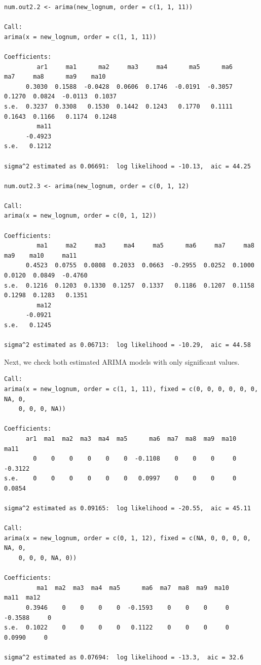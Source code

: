 \documentclass[a4paper]{article}
\begin{document}
\begin{verbatim}
num.out2.2 <- arima(new_lognum, order = c(1, 1, 11))

Call:
arima(x = new_lognum, order = c(1, 1, 11))

Coefficients:
         ar1     ma1      ma2     ma3     ma4      ma5      ma6     ma7     ma8      ma9    ma10
      0.3030  0.1588  -0.0428  0.0606  0.1746  -0.0191  -0.3057  0.1270  0.0824  -0.0113  0.1037
s.e.  0.3237  0.3308   0.1530  0.1442  0.1243   0.1770   0.1111  0.1643  0.1166   0.1174  0.1248
         ma11
      -0.4923
s.e.   0.1212

sigma^2 estimated as 0.06691:  log likelihood = -10.13,  aic = 44.25

num.out2.3 <- arima(new_lognum, order = c(0, 1, 12)

Call:
arima(x = new_lognum, order = c(0, 1, 12))

Coefficients:
         ma1     ma2     ma3     ma4     ma5      ma6     ma7     ma8     ma9    ma10     ma11
      0.4523  0.0755  0.0808  0.2033  0.0663  -0.2955  0.0252  0.1000  0.0120  0.0849  -0.4760
s.e.  0.1216  0.1203  0.1330  0.1257  0.1337   0.1186  0.1207  0.1158  0.1298  0.1283   0.1351
         ma12
      -0.0921
s.e.   0.1245

sigma^2 estimated as 0.06713:  log likelihood = -10.29,  aic = 44.58
\end{verbatim}

Next, we check both estimated ARIMA models with only significant values.\\

\begin{verbatim}
Call:
arima(x = new_lognum, order = c(1, 1, 11), fixed = c(0, 0, 0, 0, 0, 0, NA, 0, 
    0, 0, 0, NA))

Coefficients:
      ar1  ma1  ma2  ma3  ma4  ma5      ma6  ma7  ma8  ma9  ma10     ma11
        0    0    0    0    0    0  -0.1108    0    0    0     0  -0.3122
s.e.    0    0    0    0    0    0   0.0997    0    0    0     0   0.0854

sigma^2 estimated as 0.09165:  log likelihood = -20.55,  aic = 45.11

Call:
arima(x = new_lognum, order = c(0, 1, 12), fixed = c(NA, 0, 0, 0, 0, NA, 0, 
    0, 0, 0, NA, 0))

Coefficients:
         ma1  ma2  ma3  ma4  ma5      ma6  ma7  ma8  ma9  ma10     ma11  ma12
      0.3946    0    0    0    0  -0.1593    0    0    0     0  -0.3588     0
s.e.  0.1022    0    0    0    0   0.1122    0    0    0     0   0.0990     0

sigma^2 estimated as 0.07694:  log likelihood = -13.3,  aic = 32.6
\end{verbatim}
\end{document}
